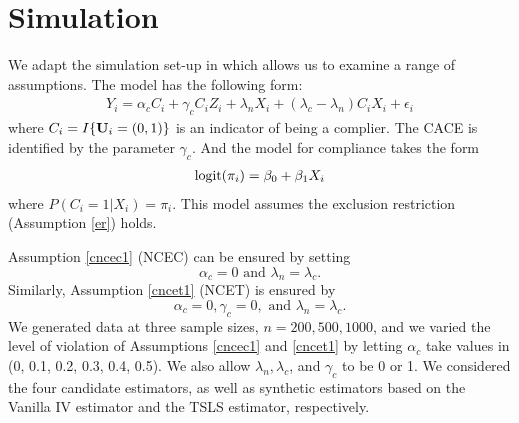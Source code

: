 \documentclass{article}
\begin{document}




\section{Simulation}
We adapt the simulation set-up in \cite{stuart2015assessing} which allows us to examine a range of assumptions. The model has the following form:
\begin{align}
Y_i = \alpha_c C_i + \gamma_cC_iZ_i + \lambda_n X_i + (\lambda_c - \lambda_n)C_iX_i + \epsilon_i
\end{align}
where $C_i = I\{{\bf U}_i = (0, 1)\}$ is an indicator of being a complier. The CACE is identified by the parameter $\gamma_c$. And the model for compliance takes the form
\begin{align}
\mbox{logit}(\pi_i) = \beta_0 + \beta_1X_i
\end{align}
where $P(C_i = 1 | X_i) = \pi_i$. %
This model assumes the exclusion restriction (Assumption \ref{er}) holds.

Assumption \ref{cncec1} (NCEC)  can be ensured by setting \[
\alpha_c = 0 \text{ and } \lambda_n = \lambda_c.
\] 
Similarly, Assumption \ref{cncet1} (NCET) is ensured by 
\[
\alpha_c = 0, \gamma_c = 0, \text{ and } \lambda_n = \lambda_c.
\] 
We generated data at three sample sizes, $n = 200, 500, 1000$, and we varied the level of violation of Assumptions \ref{cncec1} and \ref{cncet1} by letting $\alpha_c$ take values in (0, 0.1, 0.2, 0.3, 0.4, 0.5).  We also allow $\lambda_n, \lambda_c$, and $\gamma_c$ to be 0 or 1. We considered the four candidate estimators, as well as synthetic estimators based on the Vanilla IV estimator and the TSLS estimator, respectively. 
\end{document}
